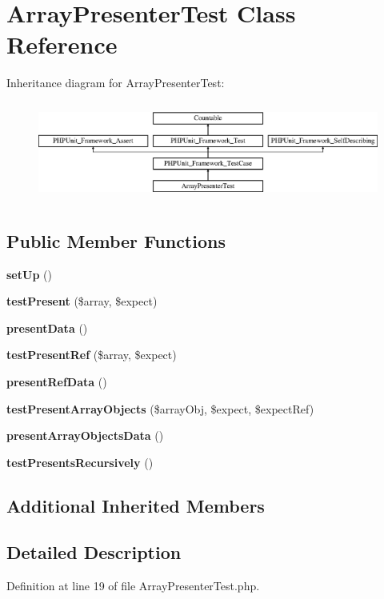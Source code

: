 \section{Array\+Presenter\+Test Class Reference}
\label{class_psy_1_1_test_1_1_presenter_1_1_array_presenter_test}
Inheritance diagram for Array\+Presenter\+Test\+:\begin{figure}[H]
\begin{center}
\leavevmode
\includegraphics[height=3.303835cm]{class_psy_1_1_test_1_1_presenter_1_1_array_presenter_test}
\end{center}
\end{figure}
\subsection*{Public Member Functions}
\begin{DoxyCompactItemize}
\item 
{\bf set\+Up} ()
\item 
{\bf test\+Present} (\$array, \$expect)
\item 
{\bf present\+Data} ()
\item 
{\bf test\+Present\+Ref} (\$array, \$expect)
\item 
{\bf present\+Ref\+Data} ()
\item 
{\bf test\+Present\+Array\+Objects} (\$array\+Obj, \$expect, \$expect\+Ref)
\item 
{\bf present\+Array\+Objects\+Data} ()
\item 
{\bf test\+Presents\+Recursively} ()
\end{DoxyCompactItemize}
\subsection*{Additional Inherited Members}


\subsection{Detailed Description}


Definition at line 19 of file Array\+Presenter\+Test.\+php.




